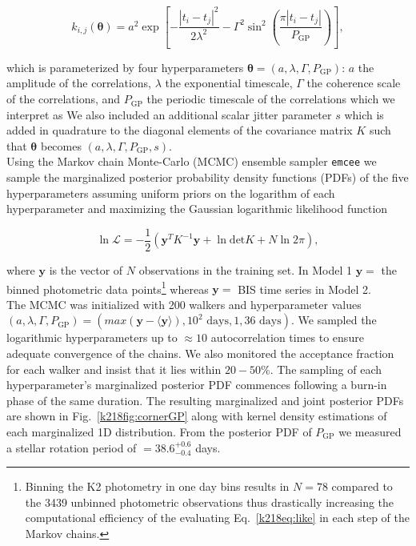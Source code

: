 \begin{equation}
k_{i,j}(\boldsymbol{\theta}) = a^2 \exp{\left[ - \frac{|t_i-t_j|^2}{2\lambda^2} -\Gamma^2
    \sin^2{\left(\frac{\pi|t_i-t_j|}{P_{\text{GP}}} \right)} \right]},
\label{k218eq:cov}
\end{equation}

\noindent which is parameterized by four hyperparameters
$\boldsymbol{\theta}=(a,\lambda,\Gamma,P_{\text{GP}})$: $a$ the amplitude of the
correlations, $\lambda$ the exponential timescale, $\Gamma$ the coherence scale of the
correlations, and $P_{\text{GP}}$ the periodic timescale of the correlations which we
interpret as  We also included an additional
scalar jitter parameter $s$ which is added in quadrature to the diagonal elements of the
covariance matrix $K$ such that $\boldsymbol{\theta}$ becomes $(a,\lambda,\Gamma,P_{\text{GP}},s)$. \\

Using the Markov chain Monte-Carlo (MCMC)
ensemble sampler \texttt{emcee} \citep{foremanmackey13} we sample the marginalized
posterior probability density functions (PDFs) of the five hyperparameters assuming 
uniform priors on the logarithm of each hyperparameter and maximizing the Gaussian
logarithmic likelihood function

\begin{equation}
\ln{\mathcal{L}} = -\frac{1}{2} \left( \mathbf{y}^T K^{-1} \mathbf{y}
+ \ln{\mathrm{det} K} + N \ln{2 \pi} \right),
\label{k218eq:like}
\end{equation}

\noindent where $\mathbf{y}$ is the vector of $N$ observations in the training set. In Model 1 $\mathbf{y}=$ 
the binned photometric data points\footnote{Binning
  the K2 photometry in one day bins results in $N=78$ compared to the 3439 unbinned photometric
  observations thus drastically increasing the computational efficiency of the evaluating Eq.~\ref{k218eq:like} in
  each step of the Markov chains.} whereas $\mathbf{y}=$ BIS time series in Model 2. \\

The MCMC was initialized with 200 walkers and hyperparameter values
$(a,\lambda,\Gamma,P_{\text{GP}})= (max(\mathbf{y}-\langle \mathbf{y} \rangle), 10^2\text{ days}, 1, 36\text{ days})$.
We sampled the logarithmic hyperparameters up to $\approx 10$ autocorrelation times to ensure
adequate convergence of the chains. We also monitored the acceptance fraction for each walker and insist
that it lies within $20-50$\%. The sampling of each hyperparameter's marginalized posterior PDF
commences following a burn-in phase of the same duration.
The resulting marginalized  and joint posterior PDFs are shown in Fig.~\ref{k218fig:cornerGP} along with
kernel density estimations of each marginalized 1D distribution. From the posterior
PDF of $P_{\text{GP}}$ we measured a stellar rotation period of \prot{} $= 38.6^{+0.6}_{-0.4}$ days.


